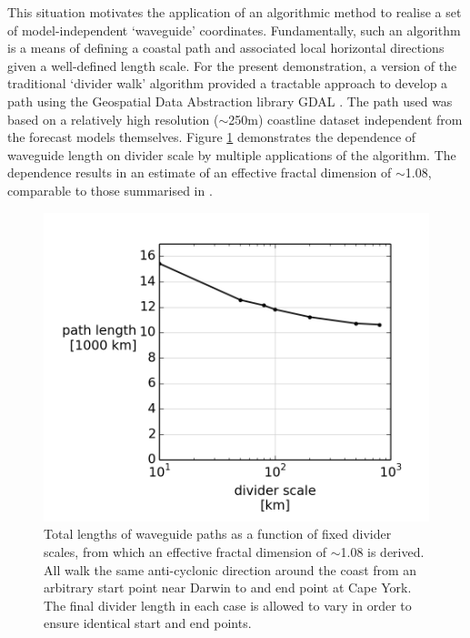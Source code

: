This situation motivates the application of an algorithmic method to realise a set of model-independent `waveguide' coordinates.
Fundamentally, such an algorithm is a means of defining a coastal path and associated local horizontal directions given a well-defined length scale.
For the present demonstration, a version of the traditional `divider walk' \citep{Xu:1993} algorithm provided a tractable approach to develop a path using the Geospatial Data Abstraction library GDAL \citep{gdal}. 
The path used was based on a relatively high resolution ($\sim$250m) coastline dataset independent from the forecast models themselves.
Figure \ref{fig:mandelbrot_lengths} demonstrates the dependence of waveguide length on divider scale by multiple applications of the algorithm.  The dependence results in an estimate of an effective fractal dimension of $\sim$1.08, comparable to those summarised in \citep{MA2016}.
\begin{figure}[H]\centering
    \noindent\includegraphics[width=\myfigwidthHalf]{figures/plots/mandelbrot_lengths.png}
    \caption[Waveguide length dependence on scale]{Total lengths of waveguide paths as a function of fixed divider scales, from which an effective fractal dimension of $\sim$1.08 is derived.  
All walk the same anti-cyclonic direction around the coast from an arbitrary start point near Darwin to and end point at Cape York. 
The final divider length in each case is allowed to vary in order to ensure identical start and end points.}
    \label{fig:mandelbrot_lengths}
\end{figure}  
